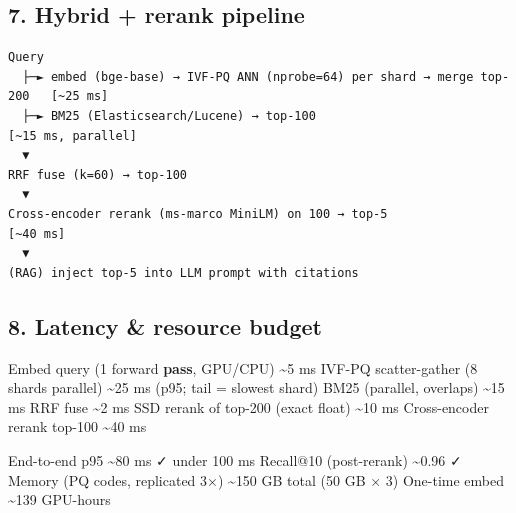 \documentclass[11pt]{article}
\newenvironment{Shaded}{\begin{snugshade}}{\end{snugshade}}
\newcommand{\BuiltInTok}[1]{\textcolor[rgb]{0.50,0.55,0.55}{#1}}
\newcommand{\ControlFlowTok}[1]{\textcolor[rgb]{0.99,0.74,0.29}{\textbf{#1}}}
\newcommand{\DecValTok}[1]{\textcolor[rgb]{0.96,0.45,0.00}{#1}}
\newcommand{\FloatTok}[1]{\textcolor[rgb]{0.96,0.45,0.00}{#1}}
\newcommand{\NormalTok}[1]{\textcolor[rgb]{0.81,0.81,0.76}{#1}}
\newcommand{\OperatorTok}[1]{\textcolor[rgb]{0.81,0.81,0.76}{#1}}
\begin{document}
\subsection{7. Hybrid + rerank pipeline}\label{7-hybrid--rerank-pipeline}

\setcodelang{}

\begin{verbatim}
Query
  ├─► embed (bge-base) → IVF-PQ ANN (nprobe=64) per shard → merge top-200   [~25 ms]
  ├─► BM25 (Elasticsearch/Lucene) → top-100                                  [~15 ms, parallel]
  ▼
RRF fuse (k=60) → top-100
  ▼
Cross-encoder rerank (ms-marco MiniLM) on 100 → top-5                        [~40 ms]
  ▼
(RAG) inject top-5 into LLM prompt with citations
\end{verbatim}

\subsection{8. Latency \& resource budget}\label{8-latency--resource-budget}


\begin{Shaded}
\begin{Highlighting}[]
\NormalTok{Embed query (}\DecValTok{1}\NormalTok{ forward }\ControlFlowTok{pass}\NormalTok{, GPU}\OperatorTok{/}\NormalTok{CPU)     }\OperatorTok{\textasciitilde{}}\DecValTok{5}\NormalTok{ ms}
\NormalTok{IVF}\OperatorTok{{-}}\NormalTok{PQ scatter}\OperatorTok{{-}}\NormalTok{gather (}\DecValTok{8}\NormalTok{ shards parallel) }\OperatorTok{\textasciitilde{}}\DecValTok{25}\NormalTok{ ms  (p95}\OperatorTok{;}\NormalTok{ tail }\OperatorTok{=}\NormalTok{ slowest shard)}
\NormalTok{BM25 (parallel, overlaps)                 }\OperatorTok{\textasciitilde{}}\DecValTok{15}\NormalTok{ ms}
\NormalTok{RRF fuse                                  }\OperatorTok{\textasciitilde{}}\DecValTok{2}\NormalTok{ ms}
\NormalTok{SSD rerank of top}\OperatorTok{{-}}\DecValTok{200}\NormalTok{ (exact }\BuiltInTok{float}\NormalTok{)       }\OperatorTok{\textasciitilde{}}\DecValTok{10}\NormalTok{ ms}
\NormalTok{Cross}\OperatorTok{{-}}\NormalTok{encoder rerank top}\OperatorTok{{-}}\DecValTok{100}              \OperatorTok{\textasciitilde{}}\DecValTok{40}\NormalTok{ ms}

\NormalTok{End}\OperatorTok{{-}}\NormalTok{to}\OperatorTok{{-}}\NormalTok{end p95                            }\OperatorTok{\textasciitilde{}}\DecValTok{80}\NormalTok{ ms  ✓ under }\DecValTok{100}\NormalTok{ ms}
\NormalTok{Recall}\OperatorTok{@}\DecValTok{10}\NormalTok{ (post}\OperatorTok{{-}}\NormalTok{rerank)                   }\OperatorTok{\textasciitilde{}}\FloatTok{0.96}\NormalTok{   ✓}
\NormalTok{Memory (PQ codes, replicated }\DecValTok{3}\NormalTok{×)          }\OperatorTok{\textasciitilde{}}\DecValTok{150}\NormalTok{ GB total  (}\DecValTok{50}\NormalTok{ GB × }\DecValTok{3}\NormalTok{)}
\NormalTok{One}\OperatorTok{{-}}\NormalTok{time embed                            }\OperatorTok{\textasciitilde{}}\DecValTok{139}\NormalTok{ GPU}\OperatorTok{{-}}\NormalTok{hours}
\end{Highlighting}
\end{Shaded}
\end{document}
